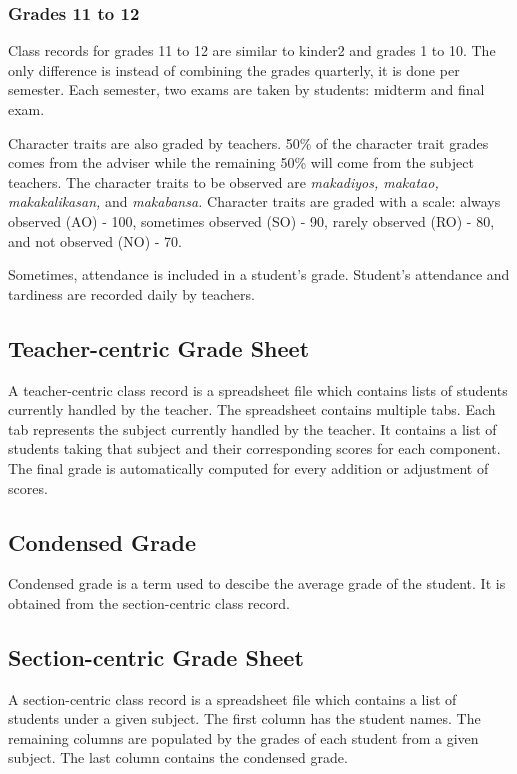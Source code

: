 \documentclass[11pt,a4paper,titlepage]{article}
\begin{document}
\subsubsection{Grades 11 to 12}
Class records for grades 11 to 12 are similar to kinder2 and grades 1 to 10. The only difference is instead of combining the grades quarterly, it is done per semester. Each semester, two exams are taken by students: midterm and final exam.

Character traits are also graded by teachers. 50\% of the character trait grades comes from the adviser while the remaining 50\% will come from the subject teachers. The character traits to be observed are \textit{makadiyos, makatao, makakalikasan,} and \textit{makabansa.} Character traits are graded with a scale: always observed (AO) - 100, sometimes observed (SO) - 90, rarely observed (RO) - 80, and not observed (NO) - 70.

Sometimes, attendance is included in a student's grade. Student's attendance and tardiness are recorded daily by teachers.

\subsection{Teacher-centric Grade Sheet}
A teacher-centric class record is a spreadsheet file which contains lists of students currently handled by the teacher. The spreadsheet contains multiple tabs. Each tab represents the subject currently handled by the teacher. It contains a list of students taking that subject and their corresponding scores for each component. The final grade is automatically computed for every addition or adjustment of scores.

\subsection{Condensed Grade}
Condensed grade is a term used to descibe the average grade of the student. It is obtained from the section-centric class record. 

\subsection{Section-centric Grade Sheet}
A section-centric class record is a spreadsheet file which contains a list of students under a given subject. The first column has the student names. The remaining columns are populated by the grades of each student from a given subject. The last column contains the condensed grade.
\end{document}

